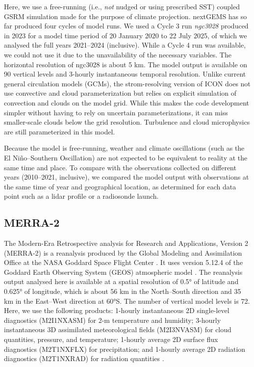 \documentclass[12pt,a4paper]{article}
\begin{document}
Here, we use a free-running (i.e., \emph{not} nudged or using prescribed SST)
coupled GSRM simulation made for the purpose of climate projection.  nextGEMS
has so far produced four cycles of model runs. We used a Cycle 3 run
\emph{ngc3028} produced in 2023 \citep{nextgems2023a,nextgems2023b} for a model
time period of 20 January 2020 to 22 July 2025, of which we analysed the full
years 2021--2024 (inclusive). While a Cycle 4 run was available, we could not
use it due to the unavailability of the necessary variables. The horizontal
resolution of ngc3028 is about 5 km.  The model output is available on 90
vertical levels and 3-hourly instantaneous temporal resolution.  Unlike current
general circulation models (GCMs), the strom-resolving version of ICON does not
use convective and cloud parameterization but relies on explicit simulation of
convection and clouds on the model grid. While this makes the code development
simpler without having to rely on uncertain parameterizations, it can miss
smaller-scale clouds below the grid resolution.  Turbulence and cloud
microphysics are still parameterized in this model.

Because the model is free-running, weather and climate oscillations (such as
the El Niño--Southern Oscillation) are not expected to be equivalent to reality
at the same time and place. To compare with the observations collected on
different years (2010--2021, inclusive), we compared the model output with
observations at the same time of year and geographical location, as determined
for each data point such as a lidar profile or a radiosonde launch.

\subsection{MERRA-2}

The Modern-Era Retrospective analysis for Research and Applications, Version 2
(MERRA-2) is a reanalysis produced by the Global Modeling and Assimilation
Office at the NASA Goddard Space Flight Center \citep{gelaro2017}.  It uses
version 5.12.4 of the Goddard Earth Observing System (GEOS) atmospheric model
\citep{rienecker2008,molod2015}. The reanalysis output analysed here is
available at a spatial resolution of 0.5° of latitude and 0.625° of longitude,
which is about 56 km in the North--South direction and 35 km in the East--West
direction at 60°S. The number of vertical model levels is 72. Here, we use the
following products: 1-hourly instantaneous 2D single-level diagnostics
(M2I1NXASM) for 2-m temperature and humidity; 3-hourly instantaneous 3D
assimilated meteorological fields (M2I3NVASM) for cloud quantities, pressure,
and temperature; 1-hourly average 2D surface flux diagnostics (M2T1NXFLX) for
precipitation; and 1-hourly average 2D radiation diagnostics
(M2T1NXRAD) for radiation quantities \citep{merra2}.
\end{document}
